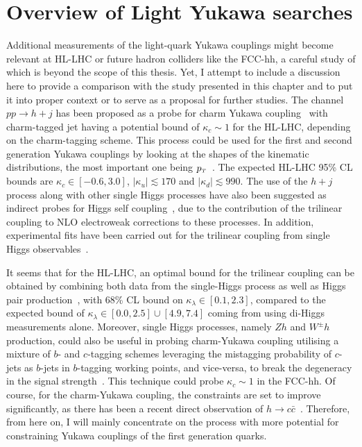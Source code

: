 \section{Overview of Light Yukawa searches \label{sec:comparetoothers}}
Additional measurements of the light-quark Yukawa couplings might become relevant at HL-LHC or future hadron colliders like the FCC-hh, a careful study of which is beyond the scope of this thesis. Yet, I attempt to include a discussion here to provide a comparison with the study presented in this chapter and to put it into proper context or to serve as a proposal for further studies.
The channel $pp \to h +j $ has been proposed as a probe for charm Yukawa coupling~\cite{Brivio:2015fxa} with charm-tagged jet having a potential bound of $\kappa_c\sim 1$ for the HL-LHC, depending on the charm-tagging scheme. This process could be used for the first and second generation Yukawa couplings by looking at the shapes of the kinematic distributions, the most important one being  $p_{\scriptscriptstyle T}$~\cite{Soreq:2016rae,Bishara:2016jga, Bonner:2016sdg}. The expected HL-LHC 95\% CL bounds are $\kappa_c \in [-0.6,3.0]$, $|\kappa_u |\lesssim 170 $ and $|\kappa_d| \lesssim 990$. The use of the $h+j$ process along with other single Higgs processes have also been suggested as indirect probes for Higgs self coupling~\cite{McCullough:2013rea,Gorbahn:2016uoy,Bizon:2016wgr,Degrassi:2016wml,Maltoni:2017ims,Degrassi:2021uik}, due to the contribution of the trilinear coupling to NLO electroweak corrections to these processes. In addition, experimental fits have been carried out for the trilinear coupling from single Higgs observables~\cite{CMS:2018rig,ATLAS:2019pbo}. 

It seems that for the HL-LHC, an optimal bound for the trilinear coupling can be obtained by combining both  data from the single-Higgs process as well as Higgs pair production~\cite{DiVita:2017eyz}, with 68\% CL bound on $\kappa_\lambda \in[0.1,2.3]$, compared to the expected bound of $\kappa_\lambda \in [0.0,2.5] \cup [4.9,7.4]$ coming from using di-Higgs measurements alone. Moreover, single Higgs processes, namely $Zh$ and $ W^\pm h$ production, could also be useful in probing charm-Yukawa coupling utilising a mixture of $b$- and $c$-tagging schemes leveraging the mistagging probability of $c$-jets as $b$-jets in $b$-tagging working points, and vice-versa, to break the degeneracy in the signal strength~\cite{Perez:2015lra}. This technique could probe $\kappa_c \sim 1$ in the FCC-hh. Of course, for the charm-Yukawa coupling, the constraints are set to improve significantly, as there has been a recent direct observation of $h\to c \bar c$~\cite{ATLAS-CONF-2021-021}. Therefore, from here on, I will mainly concentrate on the process with more potential for constraining Yukawa couplings of the first generation quarks. 

